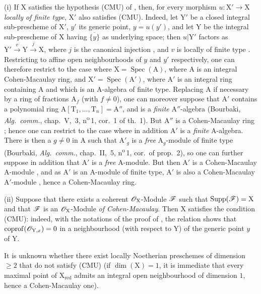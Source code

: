 \begin{remarks}[6.11.9]
\label{IV.6.11.9}
(i) If $\mathrm{X}$ satisfies the hypothesis (CMU) of , then, for every morphism $u:\mathrm{X}'\to\mathrm{X}$ \emph{locally of finite type}, $\mathrm{X}'$ also satisfies (CMU). Indeed, let $\mathrm{Y}'$ be a closed integral sub-prescheme of $\mathrm{X}'$, $y'$ its generic point, $y=u(y')$, and let $\mathrm{Y}$ be the integral sub-prescheme of $\mathrm{X}$ having $\overline{\{y\}}$ as underlying space; then $u|\mathrm{Y}'$ factors as $\mathrm{Y}'\xrightarrow{v}\mathrm{Y}\xrightarrow{j}\mathrm{X}$, where $j$ is the canonical injection , and $v$ is locally of finite type . Restricting to affine open neighbourhoods of $y$ and $y'$ respectively, one can therefore restrict to the case where $\mathrm{X}=\operatorname{Spec}(\mathrm{A})$, where $\mathrm{A}$ is an integral Cohen-Macaulay ring, and $\mathrm{X}'=\operatorname{Spec}(\mathrm{A}')$, where $\mathrm{A}'$ is an integral ring
containing $\mathrm{A}$ and which is an $\mathrm{A}$-algebra of finite type. Replacing $\mathrm{A}$ if necessary by a ring of fractions $\mathrm{A}_f$ (with $f\neq 0$), one can moreover suppose that $\mathrm{A}'$ contains a polynomial ring $\mathrm{A}[\mathrm{T}_1,\ldots,\mathrm{T}_n]=\mathrm{A}''$, and is a \emph{finite} $\mathrm{A}''$-algebra (Bourbaki, \emph{Alg.\ comm.}, chap.~V, \textsection\,3, n\textsuperscript{o}\,1, cor.~1 of th.~1). But $\mathrm{A}''$ is a Cohen-Macaulay ring ; hence one can restrict to the case where in addition $\mathrm{A}'$ is a \emph{finite} $\mathrm{A}$-algebra. There is then a $g\neq 0$ in $\mathrm{A}$ such that $\mathrm{A}'_g$ is a \emph{free} $\mathrm{A}_g$-module of finite type (Bourbaki, \emph{Alg.\ comm.}, chap.~II, \textsection\,5, n\textsuperscript{o}\,1, cor.\ of prop.~2), so one can further suppose in addition that $\mathrm{A}'$ is a \emph{free} $\mathrm{A}$-module. But then $\mathrm{A}'$ is a Cohen-Macaulay $\mathrm{A}$-module , and as $\mathrm{A}'$ is an $\mathrm{A}$-module of finite type, $\mathrm{A}'$ is also a Cohen-Macaulay $\mathrm{A}'$-module , hence a Cohen-Macaulay ring.

(ii) Suppose that there exists a coherent $\mathscr{O}_\mathrm{X}$-Module $\mathscr{F}$ such that $\operatorname{Supp}(\mathscr{F})=\mathrm{X}$ and that $\mathscr{F}$ is an $\mathscr{O}_\mathrm{X}$-Module
\emph{of Cohen-Macaulay}. Then $\mathrm{X}$ satisfies the condition (CMU): indeed, with the notations of the proof of ,
the relation  shows that $\operatorname{coprof}(\mathscr{O}_{\mathrm{Y},x})=0$ in a neighbourhood (with respect to $\mathrm{Y}$) of the
generic point $y$ of $\mathrm{Y}$.

It is unknown whether there exist locally Noetherian preschemes of dimension $\geqslant 2$ that do not satisfy (CMU)
(if $\dim(\mathrm{X})=1$, it is immediate that every maximal point of $\mathrm{X}_{\mathrm{red}}$ admits an integral open neighbourhood of dimension $1$,
hence a Cohen-Macaulay one).
\end{remarks}

